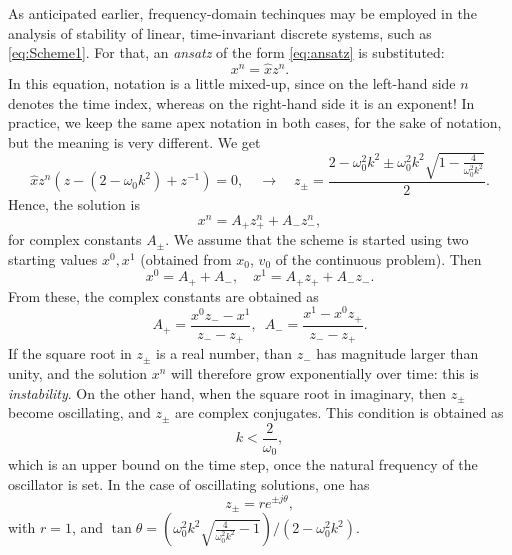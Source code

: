 \documentclass[11pt,twoside,a4paper,english]{book}
\begin{document}
As anticipated earlier, frequency-domain techinques may be employed in the analysis of stability of linear, time-invariant discrete systems, such as \eqref{eq:Scheme1}. For that, an \emph{ansatz} of the form \eqref{eq:ansatz} is substituted:
\begin{equation}
    x^n = \hat x z^{n}.
\end{equation}
In this equation, notation is a little mixed-up, since on the left-hand side $n$ denotes the time index, whereas on the right-hand side it is an exponent! In practice, we keep the same apex notation in both cases, for the sake of notation, but the meaning is very different. We get
\begin{equation}
    \hat x z^n\left( z - (2-\omega_0 k^2) + z^{-1}\right) = 0, \quad \rightarrow \quad z_{\pm} = \frac{2 - \omega_0^2 k^2 \pm \omega_0^2 k^2\sqrt{1 - \frac{4}{\omega_0^2 k^2}}}{2}.
\end{equation}
Hence, the solution is
\begin{equation}\label{eq:sol_z_SHO}
    x^n =  A_+ z^n_+ + A_- z^n_-,
\end{equation}
for complex constants $A_\pm$. We assume that the scheme is started using two starting values $x^0, x^1$ (obtained from $x_0$, $v_0$ of the continuous problem). Then
\begin{equation}
    x^0 = A_+ + A_-, \quad x^1 = A_+ z_+ + A_- z_-.
\end{equation}
From these, the complex constants are obtained as
\begin{equation}\label{eq:ApAm}
    A_+ = \frac{x^0z_- - x^1}{z_- - z_+},\,\,\, A_- = \frac{x^1 - x^0z_+ }{z_- - z_+}.
\end{equation}
If the square root in $z_\pm$ is a real number, than $z_-$ has magnitude larger than unity, and the solution $x^n$ will therefore grow exponentially over time: this is \emph{instability}. On the other hand, when the square root in imaginary, then $z_\pm$ become oscillating, and $z_\pm$ are complex conjugates. This condition is obtained as
\begin{equation}\label{eq:StabCondSHO}
    k < \frac{2}{\omega_0}, 
\end{equation}
which is an upper bound on the time step, once the natural frequency of the oscillator is set. In the case of oscillating solutions, one has
\begin{equation}
    z_\pm = r e^{\pm j \theta},
\end{equation}
with $r = 1$, and $\tan\theta = \left(\omega_0^2k^2\sqrt{\frac{4}{\omega_0^2 k^2}-1}\right)/(2-\omega_0^2 k^2)$.
\end{document}
